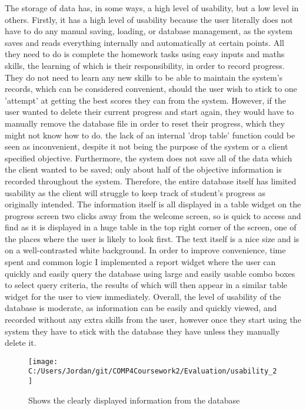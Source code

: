 The storage of data has, in some ways, a high level of usability, but a low level in others. Firstly, it has a high level of usability because the user literally does not have to do any manual saving, loading, or database management, as the system saves and reads everything internally and automatically at certain points. All they need to do is complete the homework tasks using easy inputs and maths skills, the learning of which is their responsibility, in order to record progress. They do not need to learn any new skills to be able to maintain the system's records, which can be considered convenient, should the user wish to stick to one 'attempt' at getting the best scores they can from the system. However, if the user wanted to delete their current progress and start again, they would have to manually remove the database file in order to reset their progress, which they might not know how to do. the lack of an internal 'drop table' function could be seen as inconvenient, despite it not being the purpose of the system or a client specified objective. Furthermore, the system does not save all of the data which the client wanted to be saved; only about half of the objective information is recorded throughout the system. Therefore, the entire database itself has limited usability as the client will struggle to keep track of student's progress as originally intended. The information itself is all displayed in a table widget on the progress screen two clicks away from the welcome screen, so is quick to access and find as it is displayed in a huge table in the top right corner of the screen, one of the places where the user is likely to look first. The text itself is a nice size and is on a well-contrasted white background. In order to improve convenience, time spent and common logic I implemented a report widget where the user can quickly and easily query the database using large and easily usable combo boxes to select query criteria, the results of which will then appear in a similar table widget for the user to view immediately. Overall, the level of usability of the database is moderate, as information can be easily and quickly viewed, and recorded without any extra skills from the user, however once they start using the system they have to stick with the database they have unless they manually delete it.

\begin{figure}[H]
	\texttt{[image: C:/Users/Jordan/git/COMP4Coursework2/Evaluation/usability\_2]}
	\caption{Shows the clearly displayed information from the database}
\end{figure}

